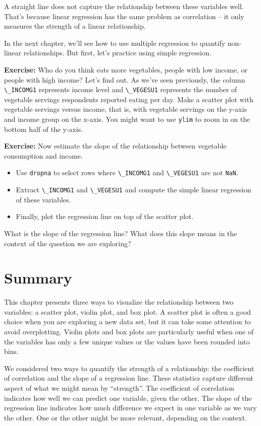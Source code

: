 A straight line does not capture the relationship between these
variables well. That's because linear regression has the same problem as
correlation -- it only measures the strength of a linear relationship.

In the next chapter, we'll see how to use multiple regression to
quantify non-linear relationships. But first, let's practice using
simple regression.

\textbf{Exercise:} Who do you think eats more vegetables, people with
low income, or people with high income? Let's find out. As we've seen
previously, the column \passthrough{\lstinline!\_INCOMG1!} represents
income level and \passthrough{\lstinline!\_VEGESU1!} represents the
number of vegetable servings respondents reported eating per day. Make a
scatter plot with vegetable servings versus income, that is, with
vegetable servings on the y-axis and income group on the x-axis. You
might want to use \passthrough{\lstinline!ylim!} to zoom in on the
bottom half of the y-axis.

\textbf{Exercise:} Now estimate the slope of the relationship between
vegetable consumption and income.

\begin{itemize}
\item
  Use \passthrough{\lstinline!dropna!} to select rows where
  \passthrough{\lstinline!\_INCOMG1!} and
  \passthrough{\lstinline!\_VEGESU1!} are not
  \passthrough{\lstinline!NaN!}.
\item
  Extract \passthrough{\lstinline!\_INCOMG1!} and
  \passthrough{\lstinline!\_VEGESU1!} and compute the simple linear
  regression of these variables.
\item
  Finally, plot the regression line on top of the scatter plot.
\end{itemize}

What is the slope of the regression line? What does this slope means in
the context of the question we are exploring?

\section{Summary}\label{summary}

This chapter presents three ways to visualize the relationship between
two variables: a scatter plot, violin plot, and box plot. A scatter plot
is often a good choice when you are exploring a new data set, but it can
take some attention to avoid overplotting. Violin plots and box plots
are particularly useful when one of the variables has only a few unique
values or the values have been rounded into bins.

We considered two ways to quantify the strength of a relationship: the
coefficient of correlation and the slope of a regression line. These
statistics capture different aspect of what we might mean by
``strength''. The coefficient of correlation indicates how well we can
predict one variable, given the other. The slope of the regression line
indicates how much difference we expect in one variable as we vary the
other. One or the other might be more relevant, depending on the
context.

